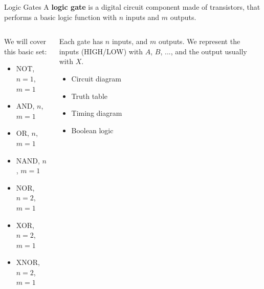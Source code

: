 \documentclass{beamer}
\begin{document}
\begin{frame}{Logic Gates}
A \textbf{logic gate} is a digital circuit component made of transistors, that performs a basic logic function with $n$ inputs and $m$ outputs. \\ \vspace{0.5cm}
\begin{columns}[T]
\begin{column}{0.5\textwidth}
We will cover this basic set:
\begin{itemize}
\item NOT, $n=1$, $m=1$
\item AND, $n$, $m=1$
\item OR, $n$, $m=1$
\item NAND, $n$, $m=1$
\item NOR, $n=2$, $m=1$
\item XOR, $n=2$, $m=1$
\item XNOR, $n=2$, $m=1$
\end{itemize}
\end{column}
\begin{column}{0.5\textwidth}
Each gate has $n$ inputs, and $m$ outputs.  We represent the inputs (HIGH/LOW) with $A$, $B$, ..., and the output usually with $X$. \\ \vspace{0.5cm}
\begin{itemize}
\item Circuit diagram
\item Truth table
\item Timing diagram
\item Boolean logic
\end{itemize}
\end{column}
\end{columns}
\end{frame}
\end{document}
